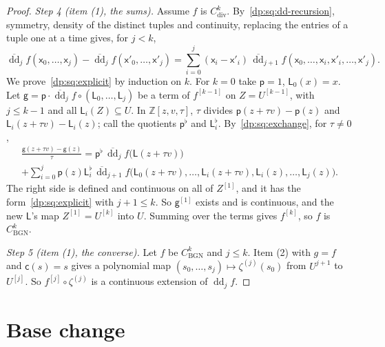\documentclass[11pt]{amsart}
\theoremstyle{definition}
\theoremstyle{remark}
\numberwithin{equation}{section}
\newcommand{\Z}{\mathbb Z}
\theoremstyle{plain}
\theoremstyle{definition}
\theoremstyle{plain}
\begin{document}
\begin{proof}
\emph{Step 4 (item (1), the sums).} Assume $f$ is $C^k_{\mathrm{div}}$. By~\eqref{dp:sq:dd-recursion}, symmetry, density of the distinct tuples and continuity, replacing the entries of a tuple one at a time gives, for $j<k$,
\begin{equation}\label{dp:sq:exchange}
 \overline{\operatorname{dd}}_jf(\mathsf x_0,\dots,\mathsf x_j)-\overline{\operatorname{dd}}_jf(\mathsf x'_0,\dots,\mathsf x'_j)=\sum_{i=0}^j(\mathsf x_i-\mathsf x'_i)\,\overline{\operatorname{dd}}_{j+1}f(\mathsf x_0,\dots,\mathsf x_i,\mathsf x'_i,\dots,\mathsf x'_j).
\end{equation}
We prove~\eqref{dp:sq:explicit} by induction on $k$. For $k=0$ take $\mathsf p=1$, $\mathsf L_0(x)=x$. Let $\mathsf g=\mathsf p\cdot\overline{\operatorname{dd}}_jf\circ(\mathsf L_0,\dots,\mathsf L_j)$ be a term of $f^{[k-1]}$ on $Z=U^{[k-1]}$, with $j\le k-1$ and all $\mathsf L_i(Z)\subseteq U$. In $\Z[z,v,\tau]$, $\tau$ divides $\mathsf p(z+\tau v)-\mathsf p(z)$ and $\mathsf L_i(z+\tau v)-\mathsf L_i(z)$; call the quotients $\mathsf p^\flat$ and $\mathsf L_i^\flat$. By~\eqref{dp:sq:exchange}, for $\tau\ne0$,
\begin{multline*}
 \frac{\mathsf g(z+\tau v)-\mathsf g(z)}\tau=\mathsf p^\flat\,\overline{\operatorname{dd}}_jf\bigl(\mathsf L(z+\tau v)\bigr)\\
 +\sum_{i=0}^j\mathsf p(z)\mathsf L_i^\flat\,\overline{\operatorname{dd}}_{j+1}f\bigl(\mathsf L_0(z+\tau v),\dots,\mathsf L_i(z+\tau v),\mathsf L_i(z),\dots,\mathsf L_j(z)\bigr).
\end{multline*}
The right side is defined and continuous on all of $Z^{[1]}$, and it has the form~\eqref{dp:sq:explicit} with $j+1\le k$. So $\mathsf g^{[1]}$ exists and is continuous, and the new $\mathsf L$'s map $Z^{[1]}=U^{[k]}$ into $U$. Summing over the terms gives $f^{[k]}$, so $f$ is $C^k_{\mathrm{BGN}}$.

\emph{Step 5 (item (1), the converse).} Let $f$ be $C^k_{\mathrm{BGN}}$ and $j\le k$. Item (2) with $g=f$ and $\mathsf c(s)=s$ gives a polynomial map $(s_0,\dots,s_j)\mapsto\zeta^{(j)}(s_0)$ from $U^{j+1}$ to $U^{[j]}$. So $f^{[j]}\circ\zeta^{(j)}$ is a continuous extension of $\operatorname{dd}_jf$.
\end{proof}
\section{Base change}\label{dp:sec:base-change}
\end{document}
